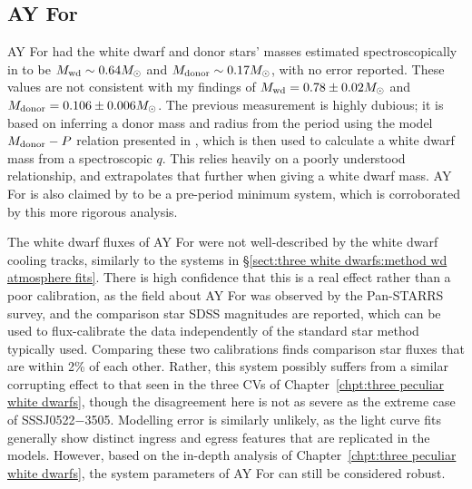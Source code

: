\newpage
\subsection{AY For}

AY For had the white dwarf and donor stars' masses estimated spectroscopically in \citet{mason2005} to be $M_{\rm wd} \sim 0.64 M_\odot$ and $M_{\rm donor} \sim 0.17 M_\odot$, with no error reported.
These values are not consistent with my findings of $M_{\rm wd} = 0.78\pm0.02 M_\odot$ and $M_{\rm donor} = 0.106\pm0.006 M_\odot$.
The previous measurement is highly dubious; it is based on inferring a donor mass and radius from the period using the model $M_{\rm donor} - P$ relation presented in \citet{howell2002}, which is then used to calculate a white dwarf mass from a spectroscopic $q$. This relies heavily on a poorly understood relationship, and extrapolates that further when giving a white dwarf mass.
AY For is also claimed by \citet{mason2005} to be a pre-period minimum system, which is corroborated by this more rigorous analysis.

The white dwarf fluxes of AY For were not well-described by the white dwarf cooling tracks, similarly to the systems in \S\ref{sect:three white dwarfs:method wd atmosphere fits}. There is high confidence that this is a real effect rather than a poor calibration, as the field about AY For was observed by the Pan-STARRS survey, and the comparison star SDSS magnitudes are reported, which can be used to flux-calibrate the data independently of the standard star method typically used. Comparing these two calibrations finds comparison star fluxes that are within 2\% of each other. Rather, this system possibly suffers from a similar corrupting effect to that seen in the three CVs of Chapter~\ref{chpt:three peculiar white dwarfs}, though the disagreement here is not as severe as the extreme case of SSSJ0522$-$3505. Modelling error is similarly unlikely, as the light curve fits generally show distinct ingress and egress features that are replicated in the models. However, based on the in-depth analysis of Chapter~\ref{chpt:three peculiar white dwarfs}, the system parameters of AY For can still be considered robust.


%     

